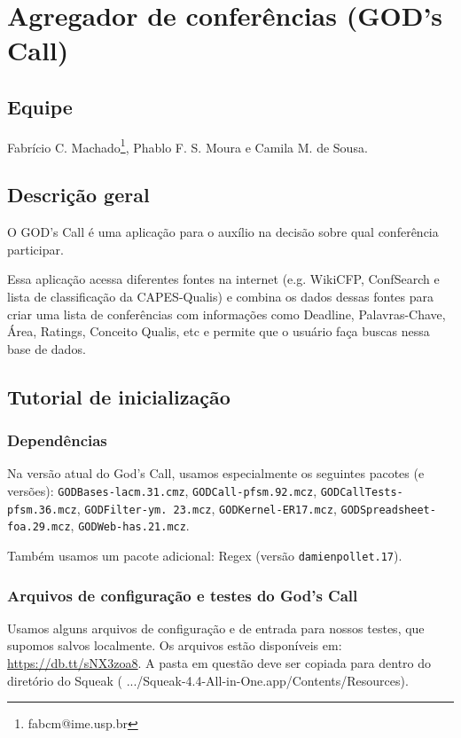 \section{Agregador de conferências (GOD's Call)}
\subsection{Equipe}
	 Fabrício C. Machado\footnote{fabcm@ime.usp.br}, Phablo F. S. Moura e Camila M. de Sousa.

\subsection{Descrição geral}
  O GOD's Call é uma aplicação para o auxílio na decisão sobre qual conferência participar.
  
  Essa aplicação acessa diferentes fontes na internet (e.g. WikiCFP, ConfSearch e lista de classificação da CAPES-Qualis) e  combina os dados dessas fontes para criar uma lista de conferências com informações como Deadline, Palavras-Chave, Área, Ratings, Conceito Qualis, etc e permite que o usuário faça buscas nessa base de dados.

\subsection{Tutorial de inicialização} %

\subsubsection{Dependências}

Na versão atual do God's Call, usamos especialmente os seguintes pacotes (e versões):
\texttt{GODBases-lacm.31.cmz}, \texttt{GODCall-pfsm.92.mcz}, \texttt{GODCallTests-pfsm.36.mcz}, \texttt{GODFilter-ym. 23.mcz}, \texttt{GODKernel-ER17.mcz}, \texttt{GODSpreadsheet-foa.29.mcz}, \texttt{GODWeb-has.21.mcz}.

Também usamos um pacote adicional: Regex (versão \texttt{damienpollet.17}).

\subsubsection{Arquivos de configuração e testes do God's Call}

Usamos alguns arquivos de configuração e de entrada para nossos testes, que supomos salvos localmente. Os arquivos estão disponíveis em: \url{https://db.tt/sNX3zoa8}. A pasta em questão deve ser copiada para dentro do diretório do Squeak ( .../Squeak-4.4-All-in-One.app/Contents/Resources).

